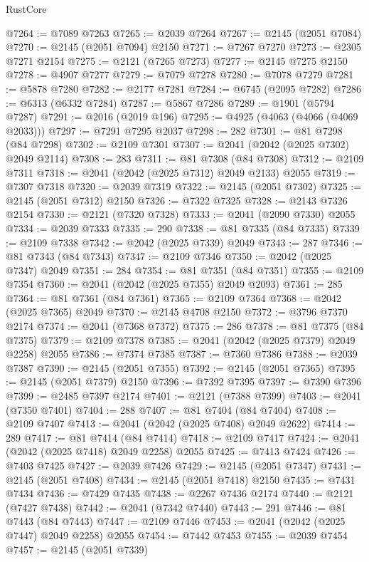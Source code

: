 \begin{lexlean}{RustCore}
\begin{coremodule}
@7264 := @7089 @7263
@7265 := @2039 @7264
@7267 := @2145 (@2051 @7084)
@7270 := @2145 (@2051 @7094) @2150
@7271 := @7267 @7270
@7273 := @2305 @7271 @2154
@7275 := @2121 (@7265 @7273)
@7277 := @2145 @7275 @2150
@7278 := @4907 @7277
@7279 := @7079 @7278
@7280 := @7078 @7279
@7281 := @5878 @7280
@7282 := @2177 @7281
@7284 := @6745 (@2095 @7282)
@7286 := @6313 (@6332 @7284)
@7287 := @5867 @7286
@7289 := @1901 (@5794 @7287)
@7291 := @2016 (@2019 @196)
@7295 := @4925 (@4063 (@4066 (@4069 @2033)))
@7297 := @7291 @7295 @2037
@7298 := 282
@7301 := @81 @7298 (@84 @7298)
@7302 := @2109 @7301
@7307 := @2041 (@2042 (@2025 @7302) @2049 @2114)
@7308 := 283
@7311 := @81 @7308 (@84 @7308)
@7312 := @2109 @7311
@7318 := @2041 (@2042 (@2025 @7312) @2049 @2133) @2055
@7319 := @7307 @7318
@7320 := @2039 @7319
@7322 := @2145 (@2051 @7302)
@7325 := @2145 (@2051 @7312) @2150
@7326 := @7322 @7325
@7328 := @2143 @7326 @2154
@7330 := @2121 (@7320 @7328)
@7333 := @2041 (@2090 @7330) @2055
@7334 := @2039 @7333
@7335 := 290
@7338 := @81 @7335 (@84 @7335)
@7339 := @2109 @7338
@7342 := @2042 (@2025 @7339) @2049
@7343 := 287
@7346 := @81 @7343 (@84 @7343)
@7347 := @2109 @7346
@7350 := @2042 (@2025 @7347) @2049
@7351 := 284
@7354 := @81 @7351 (@84 @7351)
@7355 := @2109 @7354
@7360 := @2041 (@2042 (@2025 @7355) @2049 @2093)
@7361 := 285
@7364 := @81 @7361 (@84 @7361)
@7365 := @2109 @7364
@7368 := @2042 (@2025 @7365) @2049
@7370 := @2145 @4708 @2150
@7372 := @3796 @7370 @2174
@7374 := @2041 (@7368 @7372)
@7375 := 286
@7378 := @81 @7375 (@84 @7375)
@7379 := @2109 @7378
@7385 := @2041 (@2042 (@2025 @7379) @2049 @2258) @2055
@7386 := @7374 @7385
@7387 := @7360 @7386
@7388 := @2039 @7387
@7390 := @2145 (@2051 @7355)
@7392 := @2145 (@2051 @7365)
@7395 := @2145 (@2051 @7379) @2150
@7396 := @7392 @7395
@7397 := @7390 @7396
@7399 := @2485 @7397 @2174
@7401 := @2121 (@7388 @7399)
@7403 := @2041 (@7350 @7401)
@7404 := 288
@7407 := @81 @7404 (@84 @7404)
@7408 := @2109 @7407
@7413 := @2041 (@2042 (@2025 @7408) @2049 @2622)
@7414 := 289
@7417 := @81 @7414 (@84 @7414)
@7418 := @2109 @7417
@7424 := @2041 (@2042 (@2025 @7418) @2049 @2258) @2055
@7425 := @7413 @7424
@7426 := @7403 @7425
@7427 := @2039 @7426
@7429 := @2145 (@2051 @7347)
@7431 := @2145 (@2051 @7408)
@7434 := @2145 (@2051 @7418) @2150
@7435 := @7431 @7434
@7436 := @7429 @7435
@7438 := @2267 @7436 @2174
@7440 := @2121 (@7427 @7438)
@7442 := @2041 (@7342 @7440)
@7443 := 291
@7446 := @81 @7443 (@84 @7443)
@7447 := @2109 @7446
@7453 := @2041 (@2042 (@2025 @7447) @2049 @2258) @2055
@7454 := @7442 @7453
@7455 := @2039 @7454
@7457 := @2145 (@2051 @7339)

\end{coremodule}
\end{lexlean}
